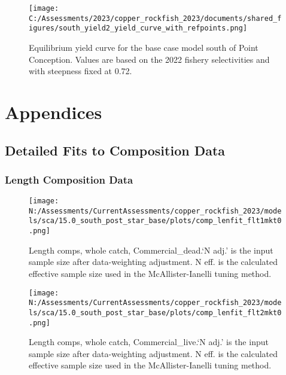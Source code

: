 \documentclass[11pt,
  english,
  letterpaper,
]{article}
\begin{document}
\pagebreak

\begin{figure}
\centering
\texttt{[image: C:/Assessments/2023/copper\_rockfish\_2023/documents/shared\_figures/south\_yield2\_yield\_curve\_with\_refpoints.png]}
\caption{Equilibrium yield curve for the base case model south of Point Conception. Values are based on the 2022 fishery selectivities and with steepness fixed at 0.72.\label{fig:yield-south}}
\end{figure}

\pagebreak

\hypertarget{appendices}{%
\section{Appendices}\label{appendices}}

\hypertarget{detailed-fit-comps}{%
\subsection{Detailed Fits to Composition Data}\label{detailed-fit-comps}}

\hypertarget{length-data}{%
\subsubsection{Length Composition Data}\label{length-data}}

\begin{figure}
\centering
\texttt{[image: N:/Assessments/CurrentAssessments/copper\_rockfish\_2023/models/sca/15.0\_south\_post\_star\_base/plots/comp\_lenfit\_flt1mkt0.png]}
\caption{Length comps, whole catch, Commercial\_dead.`N adj.' is the input sample size after data-weighting adjustment. N eff. is the calculated effective sample size used in the McAllister-Ianelli tuning method.\label{fig:comp_lenfit_flt1mkt0}}
\end{figure}

\begin{figure}
\centering
\texttt{[image: N:/Assessments/CurrentAssessments/copper\_rockfish\_2023/models/sca/15.0\_south\_post\_star\_base/plots/comp\_lenfit\_flt2mkt0.png]}
\caption{Length comps, whole catch, Commercial\_live.`N adj.' is the input sample size after data-weighting adjustment. N eff. is the calculated effective sample size used in the McAllister-Ianelli tuning method.\label{fig:comp_lenfit_flt2mkt0}}
\end{figure}
\end{document}
